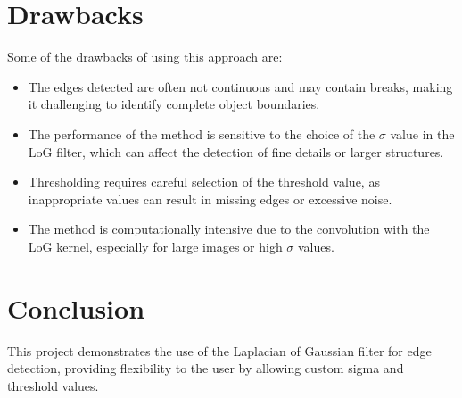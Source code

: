 \documentclass[12pt]{article}
\begin{document}
\section*{Drawbacks}
Some of the drawbacks of using this approach are:

\begin{itemize}
	\item The edges detected are often not continuous and may contain breaks, making it challenging to identify complete object boundaries.
	\item The performance of the method is sensitive to the choice of the \(\sigma\) value in the LoG filter, which can affect the detection of fine details or larger structures.
	\item Thresholding requires careful selection of the threshold value, as inappropriate values can result in missing edges or excessive noise.
	\item The method is computationally intensive due to the convolution with the LoG kernel, especially for large images or high \(\sigma\) values.
\end{itemize}

\section*{Conclusion}
This project demonstrates the use of the Laplacian of Gaussian filter for edge detection, providing flexibility to the user by allowing custom sigma and threshold values.
\end{document}
